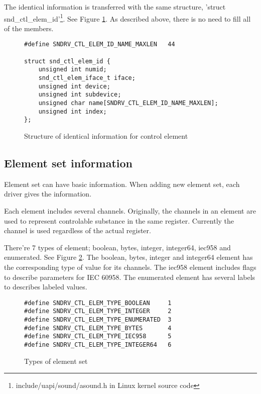 \documentclass[onecolumn]{article}
\begin{document}
The identical information is transferred with the same structure, 'struct snd\_ctl\_elem\_id'\footnote{include/uapi/sound/asound.h in Linux kernel source code}. See Figure \ref{fig:control-element-id}. As described above, there is no need to fill all of the members.

\begin{figure}[htbp]
\small
\begin{verbatim}
#define SNDRV_CTL_ELEM_ID_NAME_MAXLEN	44

struct snd_ctl_elem_id {
    unsigned int numid;
    snd_ctl_elem_iface_t iface;
    unsigned int device;
    unsigned int subdevice;
    unsigned char name[SNDRV_CTL_ELEM_ID_NAME_MAXLEN];
    unsigned int index;
};
\end{verbatim}
\caption{{Structure of identical information for control element}}
\label{fig:control-element-id}
\end{figure}


\subsection{Element set information}

Element set can have basic information. When adding new element set, each driver gives the information.

Each element includes several channels. Originally, the channels in an element are used to represent controlable substance in the same register. Currently the channel is used regardless of the actual register.

There're 7 types of element; boolean, bytes, integer, integer64, iec958 and enumerated. See Figure \ref{fig:element-set-types}. The boolean, bytes, integer and integer64 element has the corresponding type of value for its channels. The iec958 element includes flags to describe parameters for IEC 60958. The enumerated element has several labels to describes labeled values.

\begin{figure}[htbp]
\small
\begin{verbatim}
#define SNDRV_CTL_ELEM_TYPE_BOOLEAN     1
#define SNDRV_CTL_ELEM_TYPE_INTEGER     2
#define SNDRV_CTL_ELEM_TYPE_ENUMERATED  3
#define SNDRV_CTL_ELEM_TYPE_BYTES       4
#define SNDRV_CTL_ELEM_TYPE_IEC958      5
#define SNDRV_CTL_ELEM_TYPE_INTEGER64   6
\end{verbatim}
\caption{{Types of element set}}
\label{fig:element-set-types}
\end{figure}
\end{document}
